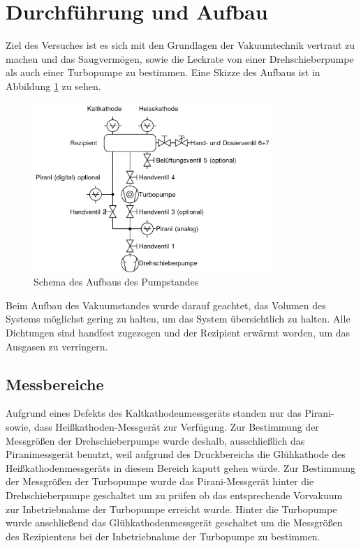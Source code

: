 \section{Durchführung und Aufbau}
\label{sec:Durchführung}
Ziel des Versuches ist es sich mit den Grundlagen der Vakuumtechnik vertraut zu machen und das Saugvermögen, sowie die Leckrate von einer Drehschieberpumpe als auch einer Turbopumpe zu bestimmen. Eine Skizze des Aufbaus ist in Abbildung \ref{fig:pump} zu sehen.
\begin{figure}[htpb]
  \centering
\includegraphics[width=0.8\textwidth]{picture/pumpaufbau.png}
\caption{Schema des Aufbaus des Pumpstandes \cite{Pfeiffer}}
  \label{fig:pump}
\end{figure}
Beim Aufbau des Vakuumstandes wurde darauf geachtet, das Volumen des Systems möglichst gering zu halten, um das System übersichtlich zu halten. Alle Dichtungen sind handfest zugezogen und der Rezipient erwärmt worden, um das Ausgasen zu verringern.
\subsection{Messbereiche}
Aufgrund eines Defekts des Kaltkathodenmessgeräts standen nur das Pirani- sowie, dass Heißkathoden-Messgerät zur Verfügung. Zur Bestimmung der Messgrößen der Drehschieberpumpe wurde deshalb, ausschließlich das Piranimessgerät benutzt, weil aufgrund des Druckbereichs die Glühkathode des Heißkathodenmessgeräts in diesem Bereich kaputt gehen würde. \newline
Zur Bestimmung der Messgrößen der Turbopumpe wurde das Pirani-Messgerät hinter die Drehschieberpumpe geschaltet um zu prüfen ob das entsprechende Vorvakuum zur Inbetriebnahme der Turbopumpe erreicht wurde. Hinter die Turbopumpe wurde anschließend das Glühkathodenmessgerät geschaltet um die Messgrößen des Rezipientens bei der Inbetriebnahme der Turbopumpe zu bestimmen.
